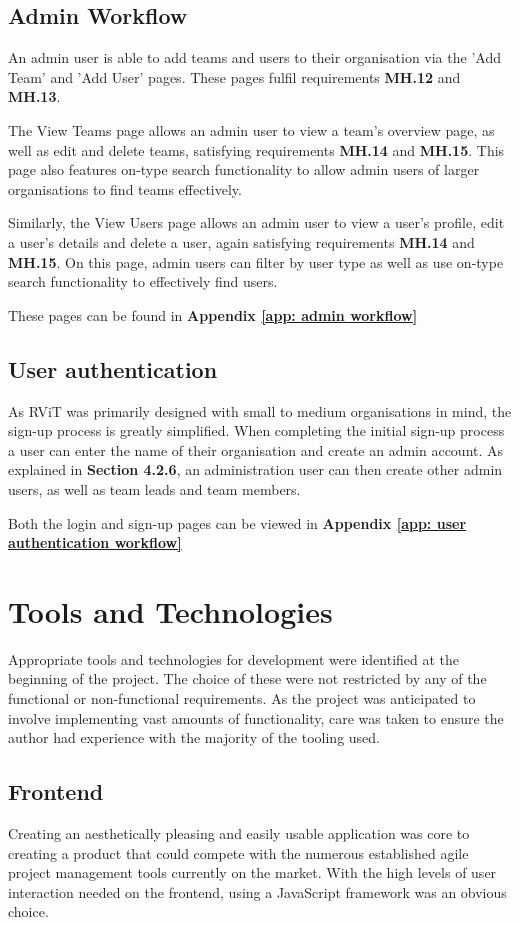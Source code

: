 \documentclass[l4proj.tex]{subfiles}
\begin{document}
\subsection{Admin Workflow}
An admin user is able to add teams and users to their organisation via the 'Add Team' and 'Add User' pages. These pages fulfil requirements \textbf{MH.12} and \textbf{MH.13}.

The View Teams page allows an admin user to view a team's overview page, as well as edit and delete teams, satisfying requirements \textbf{MH.14} and \textbf{MH.15}. This page also features on-type search functionality to allow admin users of larger organisations to find teams effectively.

Similarly, the View Users page allows an admin user to view a user's profile, edit a user's details and delete a user, again satisfying requirements \textbf{MH.14} and \textbf{MH.15}. On this page, admin users can filter by user type as well as use on-type search functionality to effectively find users.

These pages can be found in \textbf{Appendix \ref{app: admin workflow}}

\subsection{User authentication}
As RViT was primarily designed with small to medium organisations in mind, the sign-up process is greatly simplified. When completing the initial sign-up process a user can enter the name of their organisation and create an admin account. As explained in \textbf{Section 4.2.6}, an administration user can then create other admin users, as well as team leads and team members. 

Both the login and sign-up pages can be viewed in \textbf{Appendix \ref{app: user authentication workflow}}

\section{Tools and Technologies}
Appropriate tools and technologies for development were identified at the beginning of the project. The choice of these were not restricted by any of the functional or non-functional requirements. As the project was anticipated to involve implementing vast amounts of functionality, care was taken to ensure the author had experience with the majority of the tooling used. 

\subsection{Frontend}
Creating an aesthetically pleasing and easily usable application was core to creating a product that could compete with the numerous established agile project management tools currently on the market. With the high levels of user interaction needed on the frontend, using a JavaScript framework was an obvious choice. 
\end{document}
